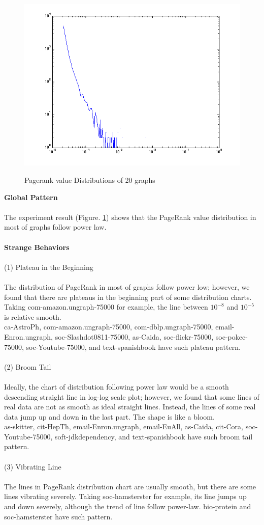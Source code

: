 \begin{figure}
  {\includegraphics[width=.25\linewidth]{FIG/pagerank/soft-jdkdependency.txt.png}} \hfill  
  \hfill  
\caption{Pagerank value Distributions of 20 graphs}
\label{fig:pagerank}
\end{figure}

\textbf{Global Pattern}
\\
\\
The experiment result (Figure. \ref{fig:pagerank}) shows that the PageRank value distribution in most of graphs follow power law.
\\
\\
\textbf{Strange Behaviors}
\\
\\
(1) Plateau in the Beginning
\\
\\
The distribution of PageRank in most of graphs follow power low; however, we found that there are plateaus in the beginning part of some distribution charts. Taking com-amazon.ungraph-75000 for example, the line between $10^{-8}$ and $10^{-5}$ is relative smooth. 
\\
ca-AstroPh, com-amazon.ungraph-75000, com-dblp.ungraph-75000, email-Enron.ungraph, soc-Slashdot0811-75000, as-Caida, soc-flickr-75000, soc-pokec-75000, soc-Youtube-75000, and text-spanishbook have such plateau pattern.
\\
\\
(2) Broom Tail
\\
\\
Ideally, the chart of distribution following power law would be a smooth descending straight line in log-log scale plot; however, we found that some lines of real data are not as smooth as ideal straight lines. Instead, the lines of some real data jump up and down in the last part. The shape is like a bloom.
\\
as-skitter, cit-HepTh, email-Enron.ungraph, email-EuAll, as-Caida, cit-Cora, soc-Youtube-75000, soft-jdkdependency, and text-spanishbook have such broom tail pattern.
\\
\\
(3) Vibrating Line
\\
\\
The lines in PageRank distribution chart are usually smooth, but there are some lines vibrating severely. Taking soc-hamsterster for example, its line jumps up and down severely, although the trend of line follow power-law. bio-protein and soc-hamsterster have such pattern.

